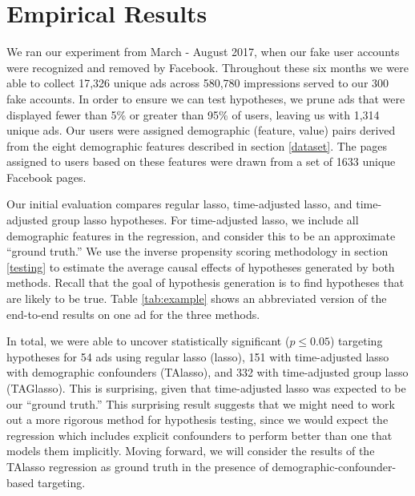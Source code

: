 \documentclass[]{article}
\begin{document}
\hypertarget{results}{%
\section{Empirical Results}\label{results}}

We ran our experiment from March - August 2017, when our fake user
accounts were recognized and removed by Facebook. Throughout these six
months we were able to collect 17,326 unique ads across 580,780
impressions served to our 300 fake accounts. In order to ensure we can
test hypotheses, we prune ads that were displayed fewer than 5\% or
greater than 95\% of users, leaving us with 1,314 unique ads. Our users
were assigned demographic (feature, value) pairs derived from the eight
demographic features described in section \ref{dataset}. The pages
assigned to users based on these features were drawn from a set of 1633
unique Facebook pages.

Our initial evaluation compares regular lasso, time-adjusted lasso, and
time-adjusted group lasso hypotheses. For time-adjusted lasso, we
include all demographic features in the regression, and consider this to
be an approximate ``ground truth.'' We use the inverse propensity
scoring methodology in section \ref{testing} to estimate the average
causal effects of hypotheses generated by both methods. Recall that the
goal of hypothesis generation is to find hypotheses that are likely to
be true. Table \ref{tab:example} shows an abbreviated version of the
end-to-end results on one ad for the three methods.

In total, we were able to uncover statistically significant
(\(p \leq 0.05\)) targeting hypotheses for 54 ads using regular lasso
(lasso), 151 with time-adjusted lasso with demographic confounders
(TAlasso), and 332 with time-adjusted group lasso (TAGlasso). This is
surprising, given that time-adjusted lasso was expected to be our
``ground truth.'' This surprising result suggests that we might need to
work out a more rigorous method for hypothesis testing, since we would
expect the regression which includes explicit confounders to perform
better than one that models them implicitly. Moving forward, we will
consider the results of the TAlasso regression as ground truth in the
presence of demographic-confounder-based targeting.
\end{document}
